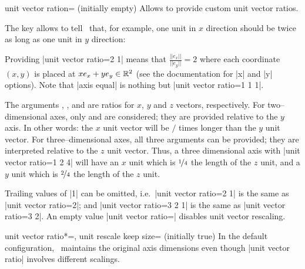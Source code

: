 \begin{pgfplotskey}{unit vector ration= (initially empty)}
	Allows to provide custom unit vector ratios. 

	The key allows to tell \PGFPlots\ that, for example, one unit in $x$ direction should be twice as long as one unit in $y$ direction:
\begin{codeexample}[]
\end{codeexample}
	\noindent Providing |unit vector ratio=2 1| means that $\frac{||e_x||}{||e_y||} = 2$ where each coordinate $(x,y)$ is placed at $x e_x + y e_y \in \mathbb{R}^2$ (see the documentation for |x| and |y| options). Note that |axis equal| is nothing but |unit vector ratio=1 1 1|.

	The arguments , , and  are ratios for $x$, $y$ and $z$ vectors, respectively. For two--dimensional axes, only  and  are considered; they are provided relative to the $y$ axis. In other words: the $x$ unit vector will be  $/$  times longer than the $y$ unit vector. For three--dimensional axes, all three arguments can be provided; they are interpreted relative to the $z$ unit vector. Thus, a three dimensional axis with |unit vector ratio=1 2 4| will have an $x$ unit which is $\nicefrac 14$ the length of the $z$ unit, and a $y$ unit which is $\nicefrac24$ the length of the $z$ unit. 
	
	Trailing values of |1| can be omitted, i.e.\ |unit vector ratio=2 1| is the same as |unit vector ratio=2|; and |unit vector ratio=3 2 1| is the same as |unit vector ratio=3 2|.
	An empty value |unit vector ratio={}| disables unit vector rescaling.

	\begin{pgfplotskeylist}{%
		unit vector ratio*=,
		unit rescale keep size= (initially true)}
	In the default configuration, \PGFPlots\ maintains the original axis dimensions even though |unit vector ratio| involves different scalings. 


\end{pgfplotskeylist}
\end{pgfplotskey}
